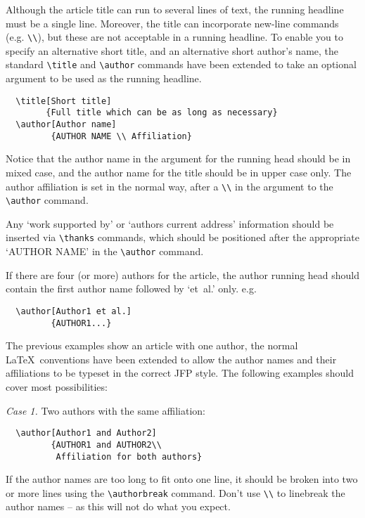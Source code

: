 \documentclass{jfp}
\begin{document}
Although the article title can run to several lines of text, the running
headline must be a single line. Moreover, the title can incorporate new-line
commands (e.g. \verb"\\"), but these are not acceptable in a running headline.
To enable you to specify an alternative short title, and an alternative short
author's name, the standard \verb"\title" and \verb"\author" commands have
been extended to take an optional argument to be used as the running headline.
%
\begin{verbatim}
  \title[Short title]
        {Full title which can be as long as necessary}
  \author[Author name]
         {AUTHOR NAME \\ Affiliation}
\end{verbatim}
%
Notice that the author name in the argument for the running head should
be in mixed case, and the author name for the title should be in upper
case only. The author affiliation is set in the normal way, after a
\verb"\\" in the argument to the \verb"\author" command.

Any `work supported by' or `authors current address' information should
be inserted via \verb"\thanks" commands, which should be positioned
after the appropriate `AUTHOR NAME' in the \verb"\author" command.

If there are four (or more) authors for the article, the author running head
should contain the first author name followed by `et~al.' only. e.g.
%
\begin{verbatim}
  \author[Author1 et al.]
         {AUTHOR1...}
\end{verbatim}

The previous examples show an article with one author, the normal
\LaTeX\ conventions have been extended to allow the author names and
their affiliations to be typeset in the correct JFP style. The following
examples should cover most possibilities:

\textit{Case 1.} Two authors with the same affiliation:
%
\begin{verbatim}
  \author[Author1 and Author2]
         {AUTHOR1 and AUTHOR2\\
          Affiliation for both authors}
\end{verbatim}
%
If the author names are too long to fit onto one line, it should be
broken into two or more lines using the \verb"\authorbreak" command.
Don't use \verb"\\" to linebreak the author names -- as this will not do what
you expect.
\end{document}
